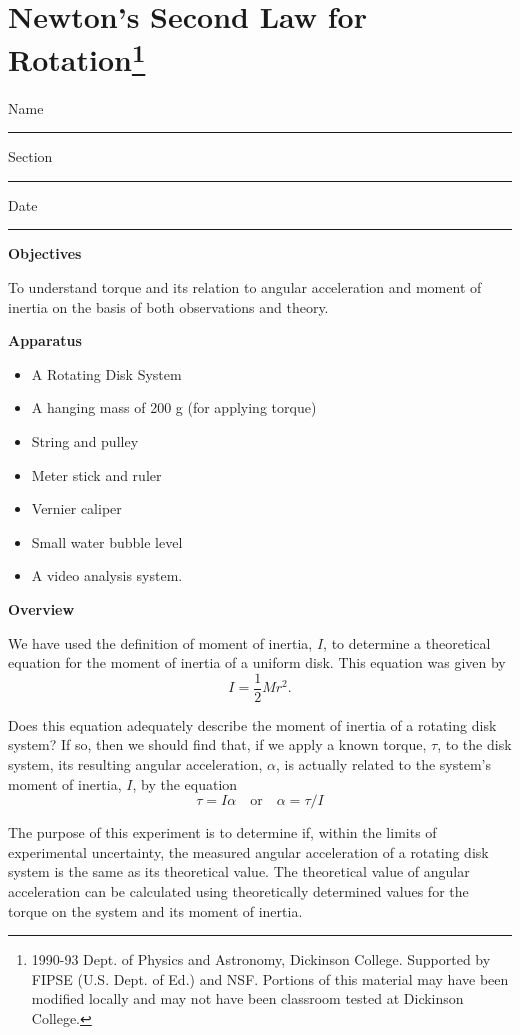 
\section{Newton's Second Law for Rotation\footnote{
1990-93 Dept. of Physics and Astronomy, Dickinson College. Supported by FIPSE
(U.S. Dept. of Ed.) and NSF. Portions of this material may have been modified
locally and may not have been classroom tested at Dickinson College.
}}

Name \rule{2.0in}{0.1pt}\hfill{}Section \rule{1.0in}{0.1pt}\hfill{}Date \rule{1.0in}{0.1pt}

\textbf{Objectives} 

To understand torque and its relation to angular acceleration and moment of
inertia on the basis of both observations and theory. 

\textbf{Apparatus}

\begin{itemize}
\item A Rotating Disk System 
\item A hanging mass of 200 g (for applying torque) 
\item String and pulley
\item Meter stick and ruler
\item Vernier caliper
\item Small water bubble level
\item A video analysis system.
\end{itemize}
\textbf{Overview} 

We have used the definition of moment of inertia, $I$, to determine a theoretical equation for the 
moment of inertia of a uniform disk. This equation was given by
\[
I=\frac{1}{2}Mr^{2}.\]


Does this equation adequately describe the moment of inertia of a rotating
disk system? If so, then we should find that, if we apply a known torque, \( \tau  \), 
to the disk system, its resulting angular acceleration, \( \alpha  \), is actually 
related to the system's moment of inertia, $I$, by the equation
\[
\tau =I\alpha \quad \mbox{or}\quad \alpha =\tau /I\]


The purpose of this experiment is to determine if, within the limits of experimental
uncertainty, the measured angular acceleration of a rotating disk system is
the same as its theoretical value. The theoretical value of angular acceleration 
can be calculated using theoretically determined values for the torque on the
system and its moment of inertia.

